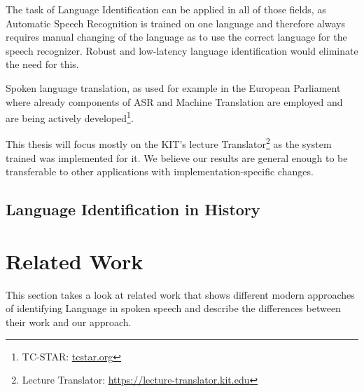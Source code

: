 The task of Language Identification can be applied in all of those fields, as Automatic Speech Recognition is trained on one language and therefore always requires manual changing of the language as to use the correct language for the speech recognizer. Robust and low-latency language identification would eliminate the need for this.

Spoken language translation, as used for example in the European Parliament where already components of ASR and Machine Translation are employed and are being actively developed\footnote{TC-STAR: \url{tcstar.org}}\cite{vilar2005statistical}. 

This thesis will focus mostly on the KIT's lecture Translator\footnote{Lecture Translator: \url{https://lecture-translator.kit.edu}}  as the system trained was implemented for it. We believe our results are general enough to be transferable to other applications with implementation-specific changes.

\subsection{Language Identification in History}
\label{sec:Introduction:LIDHistory}

\section{Related Work}
\label{ch:Intro:Related}
This section takes a look at related work that shows different modern approaches of identifying Language in spoken speech and describe the differences between their work and our approach. 